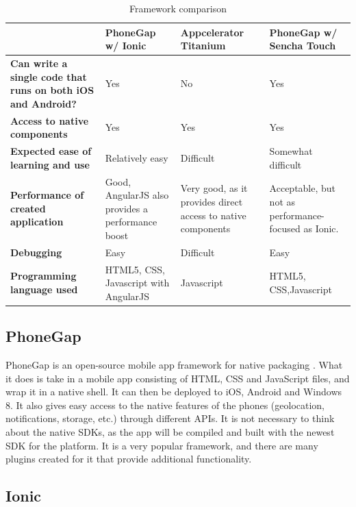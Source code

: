 \begin{table}[!h]
	\caption{Framework comparison}
		\begin{tabular}{ | p{6cm} | >{\raggedright}p{3cm} | >{\raggedright}p{3cm} | p{4cm} |}
			\hline
			\textbf{} & \textbf{PhoneGap w/ Ionic} & \textbf{Appcelerator Titanium} & \textbf{PhoneGap w/ Sencha Touch} \\ \hline
			\textbf{Can write a single code that runs on both iOS and Android?} & Yes & No & Yes \\ \hline
			\textbf{Access to native components} & Yes & Yes & Yes \\ \hline
			\textbf{Expected ease of learning and use} & Relatively easy & Difficult & Somewhat difficult \\ \hline
			\textbf{Performance of created application} & Good, AngularJS also provides a performance boost & Very good, as it provides direct access to native components & Acceptable, but not as performance- focused as Ionic. \\ \hline
			\textbf{Debugging} & Easy & Difficult & Easy \\ \hline
			\textbf{Programming language used} & HTML5, CSS, Javascript with AngularJS & Javascript & HTML5, CSS,\newline Javascript \\ \hline
		\end{tabular}
	\label{Tab:framework}
\end{table}

\subsection{PhoneGap}
\label{subsec:phonegap}

PhoneGap is an open-source mobile app framework for native packaging \cite{RA2}. What it does is take in a mobile app consisting of HTML, CSS and JavaScript files, and wrap it in a native shell. It can then be deployed to iOS, Android and Windows 8. It also gives easy access to the native features of the phones (geolocation, notifications, storage, etc.) through different APIs. It is not necessary to think about the native SDKs, as the app will be compiled and built with the newest SDK for the platform.  It is a very popular framework, and there are many plugins created for it that provide additional functionality.

\subsection{Ionic}
\label{subsec:ionic}


